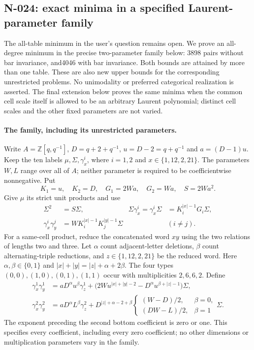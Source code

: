\subsection{N-024: exact minima in a specified Laurent-parameter family}

The all-table minimum in the user's question remains open.  We prove
an all-degree minimum in the precise two-parameter family below:
3898 pairs without bar invariance, and4046 with bar invariance.
Both bounds are attained by more than one table.  These are also new
upper bounds for the corresponding unrestricted problems.  No
unimodality or preferred categorical realization is asserted.
The final extension below proves the same minima when the common
cell scale itself is allowed to be an arbitrary Laurent polynomial;
distinct cell scales and the other fixed parameters are not varied.

\paragraph{The family, including its unrestricted parameters.}
Write $A=\mathbb Z[q,q^{-1}]$, $D=q+2+q^{-1}$,
$u=D-2=q+q^{-1}$ and $a=(D-1)u$.
Keep the ten labels $\mu,\Sigma,\gamma^i_x$, where $i=1,2$ and
$x\in\{1,12,2,21\}$.  The parameters $W,L$ range over all of $A$;
neither parameter is required to be coefficientwise nonnegative.
Put
\[
 K_1=u,\quad K_2=D,\quad G_1=2Wa,\quad G_2=Wa,\quad S=2Wa^2.
 \tag{N-151}
\]
Give $\mu$ its strict unit products and use
\[
\begin{aligned}
 \Sigma^2&=S\Sigma,&
 \Sigma\gamma^i_x=\gamma^i_x\Sigma&=K_i^{|x|-1}G_i\Sigma,\\
 \gamma^i_x\gamma^j_y&=W K_i^{|x|-1}K_j^{|y|-1}\Sigma
       &&(i\ne j).
\end{aligned}
 \tag{N-152}
\]
For a same-cell product, reduce the concatenated word $xy$ using
the two relations of lengths two and three.  Let $\alpha$ count
adjacent-letter deletions, $\beta$ count alternating-triple reductions,
and $z\in\{1,12,2,21\}$ be the reduced word.  Here
$\alpha,\beta\in\{0,1\}$ and
$|x|+|y|=|z|+\alpha+2\beta$.
The four types $(0,0),(1,0),(0,1),(1,1)$ occur with multiplicities
$2,6,6,2$.  Define
\[
\begin{aligned}
 \gamma^1_x\gamma^1_y
   &=aD^\alpha u^\beta\gamma^1_z+
       \bigl(2Wu^{|x|+|y|-2}-D^\alpha u^{\beta+|z|-1}\bigr)\Sigma,\\
 \gamma^2_x\gamma^2_y
   &=aD^\alpha L^\beta\gamma^2_z+
    D^{|z|+\alpha-2+\beta}
       \begin{cases}(W-D)/2,&\beta=0,\\(DW-L)/2,&\beta=1\end{cases}\Sigma.
\end{aligned}\tag{N-153}
\]
The exponent preceding the second bottom coefficient is zero or one.
This specifies every coefficient, including every zero coefficient;
no other dimensions or multiplication parameters vary in the family.

